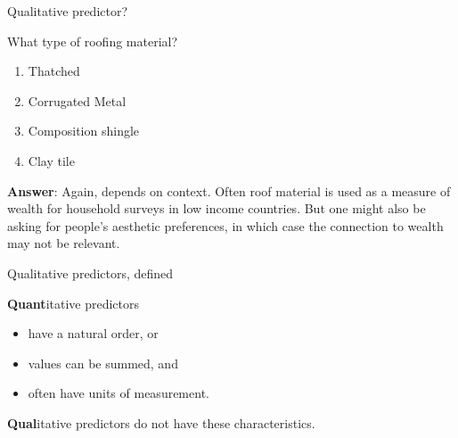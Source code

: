 \documentclass[aspectratio=169]{beamer}
\begin{document}
\begin{frame}{Qualitative predictor?}

What type of roofing material?
\begin{enumerate}
\item Thatched
\item Corrugated Metal
\item Composition shingle
\item Clay tile
\end{enumerate}

\vspace{5mm}

\textbf{Answer}: \pause Again, depends on context.  Often roof material is used as a measure of wealth for household surveys in low income countries.  But one might also be asking for people's aesthetic preferences, in which case the connection to wealth may not be relevant.  

\end{frame}

\begin{frame}{Qualitative predictors, defined}

\textbf{Quant}itative predictors 
\begin{itemize}
\item have a natural order, or
\item values can be summed, and 
\item often have units of measurement.  
\end{itemize}

\vspace{5mm}

\textbf{Qual}itative predictors do not have these characteristics.

\end{frame}
\end{document}
